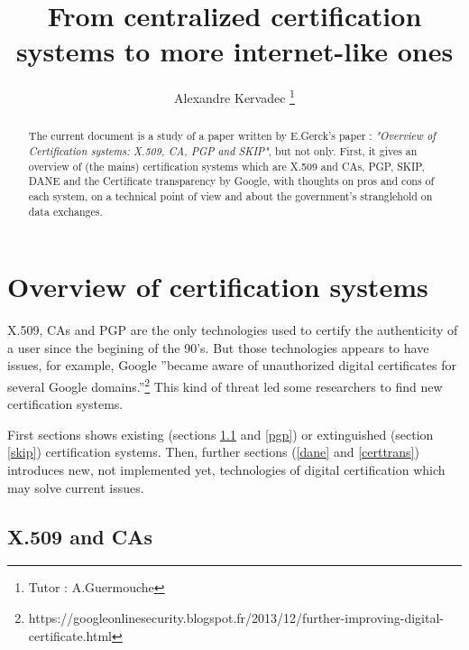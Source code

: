 \documentclass[journal, a4paper]{IEEEtran}
\begin{document}
	\title{From centralized certification systems to more internet-like ones}
	\author{Alexandre Kervadec
	\thanks{Tutor : A.Guermouche}}
	\maketitle

\begin{abstract}
The current document is a study of a paper written by E.Gerck's paper : \textit{"Overview of Certification systems: X.509, CA, PGP and SKIP"}\cite{gerck1998overview}, but not only. First, it gives an overview of (the mains) certification systems which are X.509 and CAs, PGP, SKIP, DANE and the Certificate transparency by Google, with thoughts on pros and cons of each system, on a technical point of view and about the government's stranglehold on data exchanges.
\end{abstract}

\section{Overview of certification systems}

X.509, CAs and PGP are the only technologies used to certify the authenticity of a user since the begining of the 90's. But those technologies appears to have issues, for example, Google ''became aware of unauthorized digital certificates for several Google domains.''\footnote{https://googleonlinesecurity.blogspot.fr/2013/12/further-improving-digital-certificate.html} This kind of threat led some researchers to find new certification systems.

First sections shows existing (sections \ref{x509} and \ref{pgp}) or extinguished (section \ref{skip}) certification systems. Then, further sections (\ref{dane} and \ref{certtrans}) introduces new, not implemented yet, technologies of digital certification which may solve current issues. 


\subsection{X.509 and CAs}
\label{x509}
\end{document}
